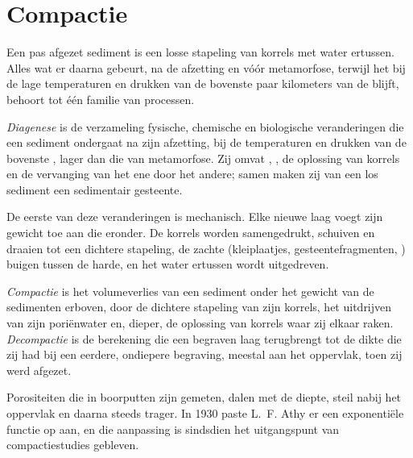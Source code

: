 \section{Compactie}\label{sec:b1:diagenesis-basins:compaction}

Een pas afgezet sediment is een losse stapeling van korrels met water ertussen. Alles wat er daarna gebeurt, na de afzetting en vóór metamorfose, terwijl het bij de lage temperaturen en drukken van de bovenste paar kilometers van de  blijft, behoort tot één familie van processen.

\begin{definition}[Diagenese]\label{def:b1:diagenesis-basins:diagenesis}
\emph{Diagenese} is de verzameling fysische, chemische en biologische veranderingen die een sediment ondergaat na zijn afzetting, bij de temperaturen en drukken van de bovenste , lager dan die van metamorfose. Zij omvat , , de oplossing van korrels en de vervanging van het ene  door het andere; samen maken zij van een los sediment een sedimentair gesteente.
\end{definition}

De eerste van deze veranderingen is mechanisch. Elke nieuwe laag voegt zijn gewicht toe aan die eronder. De korrels worden samengedrukt, schuiven en draaien tot een dichtere stapeling, de zachte (kleiplaatjes, gesteentefragmenten, ) buigen tussen de harde, en het water ertussen wordt uitgedreven.

\begin{definition}\label{def:b1:diagenesis-basins:compaction}
\emph{Compactie} is het volumeverlies van een sediment onder het gewicht van de sedimenten erboven, door de dichtere stapeling van zijn korrels, het uitdrijven van zijn poriënwater en, dieper, de oplossing van korrels waar zij elkaar raken. \emph{Decompactie} is de berekening die een begraven laag terugbrengt tot de dikte die zij had bij een eerdere, ondiepere begraving, meestal aan het oppervlak, toen zij werd afgezet.
\end{definition}

Porositeiten die in boorputten zijn gemeten, dalen met de diepte, steil nabij het oppervlak en daarna steeds trager. In 1930 paste L.~F. Athy er een exponentiële functie op aan, en die aanpassing is sindsdien het uitgangspunt van compactiestudies gebleven.

